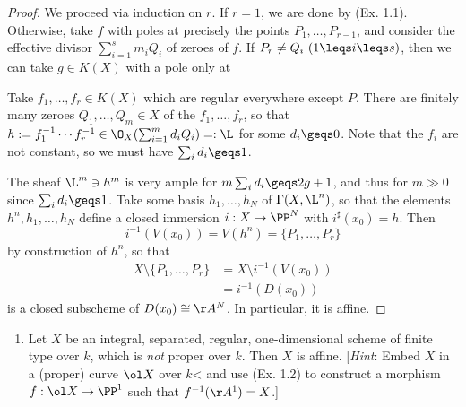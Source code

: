 \documentclass[12pt]{amsart}
\begin{document}
\begin{proof}
  We proceed via induction on $r$.
  If $r=1$, we are done by (Ex. 1.1).
  Otherwise, take $f$ with poles at precisely the points $P_1,\ldots,P_{r-1}$, and consider the effective divisor $\sum_{i=1}^s m_i Q_i$ of zeroes of $f$.
  If $P_r\neq Q_i \ (1\leqs i\leqs s)$, then we can take $g\in K(X)$ with a pole only at

  Take $f_1,\ldots,f_r\in K(X)$ which are regular everywhere except $P$.
  There are finitely many zeroes $Q_1,\ldots, Q_m\in X$ of the $f_1,\ldots, f_r$, so that $h:=f_1^{-1}\cdots f_r^{-1}\in \O_X(\sum_{i=1}^m d_iQ_i)=:\L$ for some $d_i\geqs 0$.
  Note that the $f_i$ are not constant, so we must have $\sum_i d_i\geqs 1$.

  The sheaf $\L^m\ni h^m$ is very ample for $m\sum_id_i\geqs 2g+1$, and thus for $m\gg 0$ since $\sum_id_i\geqs 1$.
  Take some basis $h_1,\ldots, h_N$ of $\Gamma(X,\L^n)$, so that the elements $h^n,h_1,\ldots, h_N$ define a closed immersion $i:X\to \PP^N$ with $i^\sharp(x_0)=h$.
  Then
  \[
    i^{-1}(V(x_0)) = V(h^n) = \{P_1,\ldots, P_r\}
  \]
  by construction of $h^n$, so that
  \begin{align*}
    X\setminus \{P_1,\ldots, P_r\}
    &= X\setminus i^{-1}(V(x_0)) \\
    &= i^{-1}(D(x_0))
  \end{align*}
  is a closed subscheme of $D(x_0)\cong \AA^N$.
  In particular, it is affine.
\end{proof}

\begin{enumerate}
	\item[3.] {
      Let $X$ be an integral, separated, regular, one-dimensional scheme of finite type over $k$, which is \emph{not} proper over $k$.
      Then $X$ is affine.
      [\emph{Hint}: Embed $X$ in a (proper) curve $\ol X$ over $k$< and use (Ex. 1.2) to construct a morphism $f:\ol X\to \PP^1$ such that $f^{-1}(\AA^1)=X$.]
    }
\end{enumerate}
\end{document}

